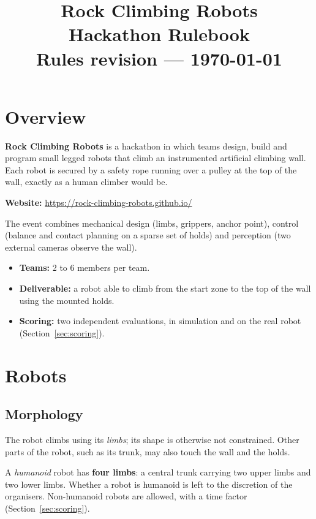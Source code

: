 \documentclass[11pt,a4paper]{article}
\title{\vspace{-12mm}\textbf{Rock Climbing Robots}\\[2mm]
       \large Hackathon Rulebook\\[4mm]
       \normalsize Rules revision \textbf{\rulesrev} --- \today}
\author{}
\date{}
\begin{document}
\maketitle
\vspace{-8mm}

\tableofcontents
\bigskip

\section{Overview}

\textbf{Rock Climbing Robots} is a hackathon in which teams design, build and
program small legged robots that climb an instrumented artificial climbing
wall. Each robot is secured by a safety rope running over a pulley at the top
of the wall, exactly as a human climber would be.

\medskip
\noindent\textbf{Website:} \url{https://rock-climbing-robots.github.io/}
\medskip

The event combines mechanical design (limbs, grippers, anchor point), control
(balance and contact planning on a sparse set of holds) and perception (two
external cameras observe the wall).

\begin{itemize}
  \item \textbf{Teams:} 2 to 6 members per team.
  \item \textbf{Deliverable:} a robot able to climb from the start zone to the
        top of the wall using the mounted holds.
  \item \textbf{Scoring:} two independent evaluations, in simulation and on
        the real robot (Section~\ref{sec:scoring}).
\end{itemize}

\section{Robots}

\subsection{Morphology}

The robot climbs using its \emph{limbs}; its shape is otherwise not
constrained. Other parts of the robot, such as its trunk, may also touch the
wall and the holds.

A \emph{humanoid} robot has \textbf{four limbs}: a central trunk carrying two
upper limbs and two lower limbs. Whether a robot is humanoid is left to the
discretion of the organisers. Non-humanoid robots are allowed, with a time
factor (Section~\ref{sec:scoring}).
\end{document}
